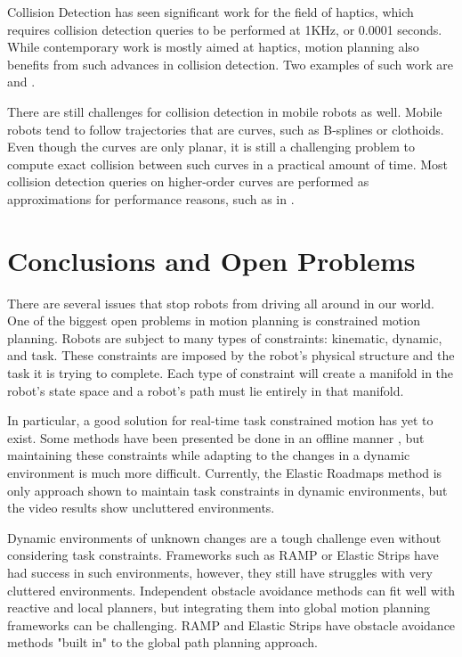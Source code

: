 \documentclass[10pt,conference]{ieeeconf}
\begin{document}
	Collision Detection has seen significant work for the field of haptics, which requires collision detection queries to be performed at 1KHz, or 0.0001 seconds. While contemporary work is mostly aimed at haptics, motion planning also benefits from such advances in collision detection. Two examples of such work are \cite{otaduy2005sensation} and \cite{barbivc2008six}. 
	
	There are still challenges for collision detection in mobile robots as well. Mobile robots tend to follow trajectories that are curves, such as B-splines or clothoids. Even though the curves are only planar, it is still a challenging problem to compute exact collision between such curves in a practical amount of time. Most collision detection queries on higher-order curves are performed as approximations for performance reasons, such as in \cite{morken2009computing}.	
	



\section{Conclusions and Open Problems}
    
    There are several issues that stop robots from driving all around in our world. One of the biggest open problems in motion planning is constrained motion planning. Robots are subject to many types of constraints: kinematic, dynamic, and task. These constraints are imposed by the robot's physical structure and the task it is trying to complete. Each type of constraint will create a manifold in the robot's state space and a robot's path must lie entirely in that manifold. 
    
    
    In particular, a good solution for real-time task constrained motion has yet to exist. Some methods have been presented be done in an offline manner \cite{stilman2007task}\cite{berenson2011task}, but maintaining these constraints while adapting to the changes in a dynamic environment is much more difficult. Currently, the Elastic Roadmaps method is only approach shown to maintain task constraints in dynamic environments, but the video results show uncluttered environments. 
    
    Dynamic environments of unknown changes are a tough challenge even without considering task constraints. Frameworks such as RAMP or Elastic Strips have had success in such environments, however, they still have struggles with very cluttered environments. Independent obstacle avoidance methods can fit well with reactive and local planners, but integrating them into global motion planning frameworks can be challenging. RAMP and Elastic Strips have obstacle avoidance methods "built in" to the global path planning approach. 
    
\end{document}
